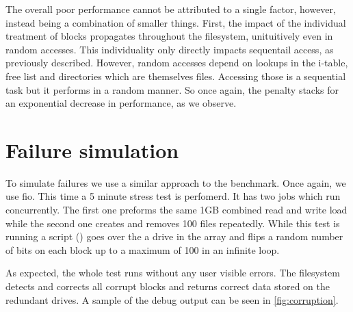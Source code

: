         The overall poor performance cannot be attributed to a single factor,
        however, instead being a combination of smaller things. First, the
        impact of the individual treatment of blocks propagates throughout the
        filesystem, unituitively even in random accesses. This individuality
        only directly impacts sequentail access, as previously described.
        However, random accesses depend on lookups in the i-table, free list
        and directories which are themselves files. Accessing those is a
        sequential task but it performs in a random manner. So once again, the
        penalty stacks for an exponential decrease in performance, as we
        observe.

    \section{Failure simulation}

        To simulate failures we use a similar approach to the benchmark. Once
        again, we use fio. This time a 5 minute stress test is perfomerd. It
        has two jobs which run concurrently. The first one preforms the same
        1GB combined read and write load while the second one creates and
        removes 100 files repeatedly. While this test is running a script
        () goes over the a drive in the array
        and flips a random number of bits on each block up to a maximum of 100
        in an infinite loop.

        As expected, the whole test runs without any user visible errors. The
        filesystem detects and corrects all corrupt blocks and returns correct
        data stored on the redundant drives. A sample of the debug output can
        be seen in \autoref{fig:corruption}.

